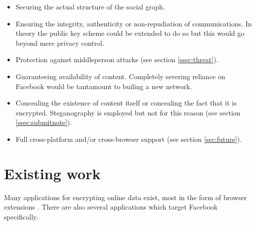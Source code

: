 \begin{itemize}

    \item Securing the actual structure of the social graph.
    
    \item Ensuring the integrity, authenticity or non-repudiation of communications. In theory the public key scheme could be extended to do so but this would go beyond mere privacy control.

    \item Protection against middleperson attacks (see section \ref{ssec:threat}).
    
    \item Guaranteeing availability of content. Completely severing reliance on Facebook would be tantamount to builing a new network.
    
    \item Concealing the existence of content itself or concealing the fact that it is encrypted. Steganography is employed but not for this reason (see section \ref{ssec:submitnote}).
    
    \item Full cross-platform and/or cross-browser support (see section \ref{sec:future}).
    
\end{itemize}


\section{Existing work}
\label{sec:existing}

    Many applications for encrypting online data exist, most in the form of browser extensions \cite{firegpg}. There are also several applications which target Facebook specifically.
    
